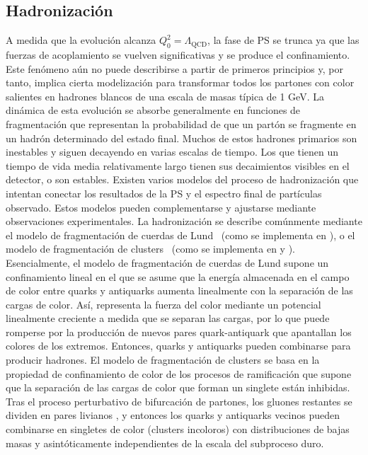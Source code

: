 \subsection{Hadronización}
\label{subsec:theory:mc_simulation:hadronisation}

A medida que la evolución alcanza \(Q^2_0 = \Lambda_{\text{QCD}} \), la fase de \ac{PS} se trunca ya que las fuerzas de acoplamiento se vuelven significativas y se produce el confinamiento. Este fenómeno aún no puede describirse a partir de primeros principios y, por tanto, implica cierta modelización para transformar todos los partones con color salientes en hadrones blancos de una escala de masas típica de 1 GeV. La dinámica de esta evolución se absorbe generalmente en funciones de fragmentación que representan la probabilidad de que un partón se fragmente en un hadrón determinado del estado final. Muchos de estos hadrones primarios son inestables y siguen decayendo en varias escalas de tiempo. Los que tienen un tiempo de vida media relativamente largo tienen sus decaimientos visibles en el detector, o son estables. Existen varios modelos del proceso de hadronización que intentan conectar los resultados de la \ac{PS} y el espectro final de partículas observado. Estos modelos pueden complementarse y ajustarse mediante observaciones experimentales. La hadronización se describe comúnmente mediante el modelo de fragmentación de cuerdas de Lund~\cite{Anderson-1983} (como se implementa en \Pythia), o el modelo de fragmentación de clusters~\cite{Webber-1984} (como se implementa en \Herwig y \Sherpa). Esencialmente, el modelo de fragmentación de cuerdas de Lund supone un confinamiento lineal en el que se asume que la energía almacenada en el campo de color entre quarks y antiquarks aumenta linealmente con la separación de las cargas de color. Así, representa la fuerza del color mediante un potencial linealmente creciente a medida que se separan las cargas, por lo que puede romperse por la producción de nuevos pares quark-antiquark que apantallan los colores de los extremos. Entonces, quarks y antiquarks pueden combinarse para producir hadrones. El modelo de fragmentación de clusters se basa en la propiedad de confinamiento de color de los procesos de ramificación que supone que la separación de las cargas de color que forman un singlete están inhibidas. Tras el proceso perturbativo de bifurcación de partones, los gluones restantes se dividen en pares livianos \qqbar, y entonces los quarks y antiquarks vecinos pueden combinarse en singletes de color (clusters incoloros) con distribuciones de bajas masas y asintóticamente independientes de la escala del subproceso duro.


